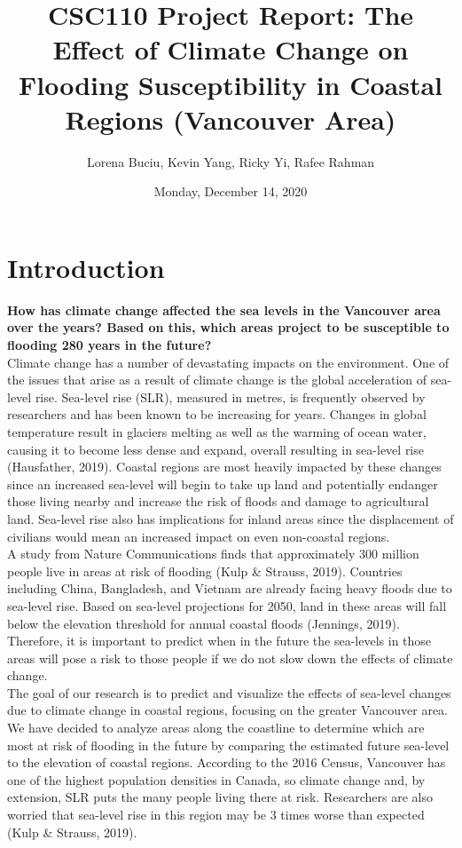 \documentclass[fontsize=11pt]{article}
\title{CSC110 Project Report: The Effect of Climate Change on Flooding Susceptibility in Coastal Regions (Vancouver Area)}
\author{Lorena Buciu, Kevin Yang, Ricky Yi, Rafee Rahman}
\date{Monday, December 14, 2020}
\begin{document}
    \maketitle

    \section*{Introduction}

    \textbf{How has climate change affected the sea levels in the Vancouver area over the years? Based on this, which areas project to be susceptible to flooding 280 years in the future?} \\

    Climate change has a number of devastating impacts on the environment. One of the issues that arise as a result of climate change is the global acceleration of sea-level rise. Sea-level rise (SLR), measured in metres, is frequently observed by researchers and has been known to be increasing for years. Changes in global temperature result in glaciers melting as well as the warming of ocean water, causing it to become less dense and expand, overall resulting in sea-level rise (Hausfather, 2019). Coastal regions are most heavily impacted by these changes since an increased sea-level will begin to take up land and potentially endanger those living nearby and increase the risk of floods and damage to agricultural land. Sea-level rise also has implications for inland areas since the displacement of civilians would mean an increased impact on even non-coastal regions. \\

    A study from Nature Communications finds that approximately 300 million people live in areas at risk of flooding (Kulp \& Strauss, 2019). Countries including China, Bangladesh, and Vietnam are already facing heavy floods due to sea-level rise. Based on sea-level projections for 2050, land in these areas will fall below the elevation threshold for annual coastal floods (Jennings, 2019). Therefore, it is important to predict when in the future the sea-levels in those areas will pose a risk to those people if we do not slow down the effects of climate change. \\

    The goal of our research is to predict and visualize the effects of sea-level changes due to climate change in coastal regions, focusing on the greater Vancouver area. We have decided to analyze areas along the coastline to determine which are most at risk of flooding in the future by comparing the estimated future sea-level to the elevation of coastal regions. According to the 2016 Census, Vancouver has one of the highest population densities in Canada, so climate change and, by extension, SLR puts the many people living there at risk. Researchers are also worried that sea-level rise in this region may be 3 times worse than expected (Kulp \& Strauss, 2019).
\end{document}
